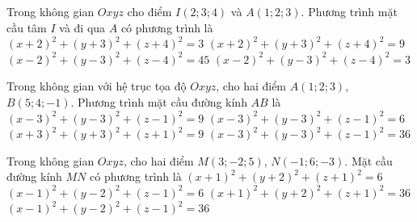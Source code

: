 \begin{ex}%
Trong không gian $Oxyz$ cho điểm $I(2;3;4)$ và $A(1;2;3)$. Phương trình mặt cầu tâm $I$ và đi qua $A$ có phương trình là
\choice
{$(x+2)^2+(y+3)^2+(z+4)^2=3$}
{$(x+2)^2+(y+3)^2+(z+4)^2=9$}
{$(x-2)^2+(y-3)^2+(z-4)^2=45$}
{\True $(x-2)^2+(y-3)^2+(z-4)^2=3$}
\end{ex}

\begin{ex}%
Trong không gian với hệ trục tọa độ $Oxyz$, cho hai điểm $A(1;2;3)$, $B(5;4;-1)$. Phương trình mặt cầu đường kính $AB$ là
\choice
{\True $(x-3)^2+(y-3)^2+(z-1)^2=9$}
{$(x-3)^2+(y-3)^2+(z-1)^2=6$}
{$(x+3)^2+(y+3)^2+(z+1)^2=9$}
{$(x-3)^2+(y-3)^2+(z-1)^2=36$}
\end{ex}

\begin{ex}%
Trong không gian $Oxyz$, cho hai điểm $M(3;-2;5)$, $N(-1;6;-3)$. Mặt cầu đường kính $MN$ có phương trình là
\choice
{$(x+1)^2+(y+2)^2+(z+1)^2=6$}
{$(x-1)^2+(y-2)^2+(z-1)^2=6$}
{$(x+1)^2+(y+2)^2+(z+1)^2=36$}
{\True $(x-1)^2+(y-2)^2+(z-1)^2=36$}
\end{ex}

